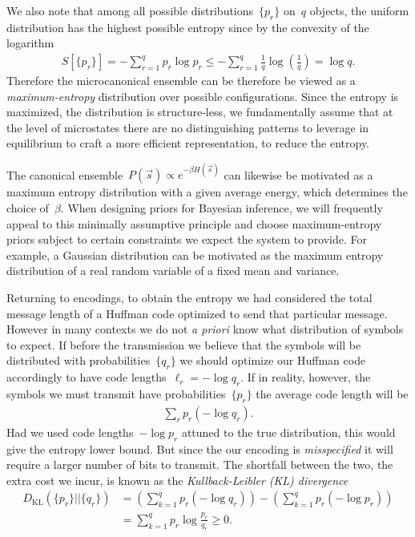 We also note that among all possible distributions~$\{p_r\}$ on~$q$ objects, the uniform distribution has the highest possible entropy since by the convexity of the logarithm \begin{align}
    S[\{p_r\}] = -\sum_{r=1}^q p_r \log p_r \leq -\sum_{r=1}^q \frac{1}{q} \log \left(\frac{1}{q}\right) = \log q.
\end{align}
Therefore the microcanonical ensemble can be therefore be viewed as a \emph{maximum-entropy} distribution over possible configurations. Since the entropy is maximized, the distribution is structure-less, we fundamentally assume that at the level of microstates there are no distinguishing patterns to leverage in equilibrium to craft a more efficient representation, to reduce the entropy. 

The canonical ensemble~$P(\vec{s}) \propto e^{-\beta H(\vec{s})}$ can likewise be motivated as a maximum entropy distribution with a given average energy, which determines the choice of~$\beta$. When designing priors for Bayesian inference, we will frequently appeal to this minimally assumptive principle and choose maximum-entropy priors subject to certain constraints we expect the system to provide. For example, a Gaussian distribution can be motivated as the maximum entropy distribution of a real random variable of a fixed mean and variance. 

Returning to encodings, to obtain the entropy we had considered the total message length of a Huffman code optimized to send that particular message. However in many contexts we do not \textit{a priori} know what distribution of symbols to expect. If before the transmission we believe that the symbols will be distributed with probabilities~$\{q_r\}$ we should optimize our Huffman code accordingly to have code lengths~$\ell_r = -\log q_r$. If in reality, however, the symbols we must transmit have probabilities~$\{p_r\}$ the average code length will be \begin{align}
    \sum_r p_r (-\log q_r).
\end{align}
Had we used code lengths~$-\log p_r$ attuned to the true distribution, this would give the entropy lower bound. But since the our encoding is \emph{misspecified} it will require a larger number of bits to transmit. The shortfall between the two, the extra cost we incur, is known as the \emph{Kullback-Leibler (KL) divergence} \begin{align}
    D_{\text{KL}}(\{p_r\}||\{q_r\}) &= \left(\sum_{k=1}^q p_r (-\log q_r) \right) - \left(\sum_{k=1}^q p_r (-\log p_r) \right) \nonumber \\
    &= \sum_{k=1}^q p_r \log \frac{p_r}{q_r} \geq 0.
\end{align}

